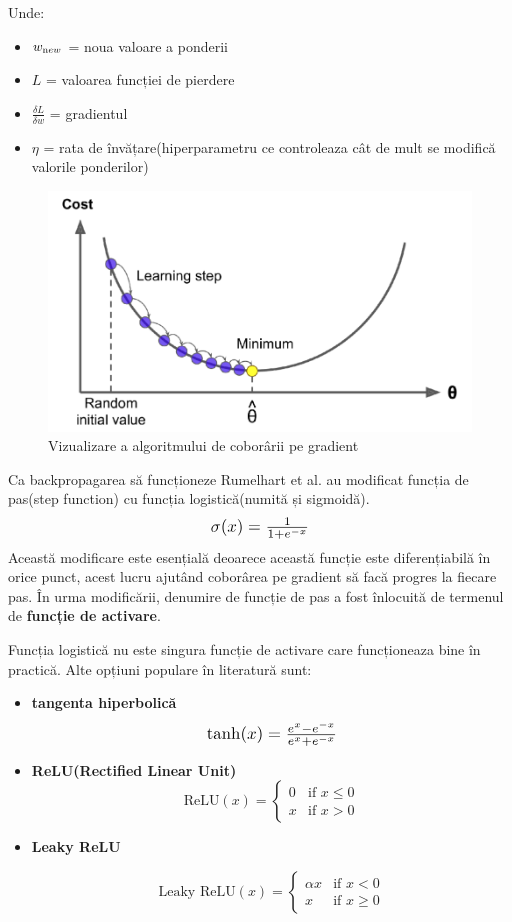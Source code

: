 Unde: 

\begin{itemize}
    \item $w_{\text new}$ = noua valoare a ponderii
    \item $L$ = valoarea funcției de pierdere
    \item $\frac{\delta L}{\delta w}$ = gradientul 
    \item $\eta$ = rata de învățare(hiperparametru ce controleaza cât de mult se modifică valorile ponderilor)
\end{itemize}

\begin{figure}[h]
         \centering 
         \includegraphics[width=.75\linewidth]{images/gradient-descent.png}
         \captionsetup{font=footnotesize}
         \caption{Vizualizare a algoritmului de coborârii pe gradient \cite{GD}}
\end{figure}
\newpage
Ca backpropagarea să funcționeze Rumelhart et al. au modificat funcția de pas(step function) cu funcția logistică(numită și sigmoidă).
\[
    \scalebox{1.2}{$\sigma(x) = \frac{1}{1 + e^{-x}}$}
\]
Această modificare este esențială deoarece această funcție este diferențiabilă în orice punct, acest lucru ajutând coborârea pe gradient să facă progres la fiecare pas. În urma modificării, denumire de funcție de pas a fost înlocuită de termenul de \textbf{funcție de activare}.

Funcția logistică nu este singura funcție de activare care funcționeaza bine în practică. Alte opțiuni populare în literatură sunt: 
\begin{itemize}
    \item \textbf{tangenta hiperbolică}
    \[
    \scalebox{1.2}{$\tanh(x) = \frac{e^x - e^{-x}}{e^x + e^{-x}}$}
    \]
    \item \textbf{ReLU(Rectified Linear Unit)}
    \[
    \text{ReLU}(x) = 
        \begin{cases} 
        0 & \text{if } x \leq 0 \\
        x & \text{if } x > 0 
        \end{cases}
    \]
    \item \textbf{Leaky ReLU}
    
    \[
    \text{Leaky ReLU}(x) = 
        \begin{cases} 
        \alpha x & \text{if } x < 0 \\
        x & \text{if } x \geq 0 
        \end{cases}
    \]
\end{itemize}

